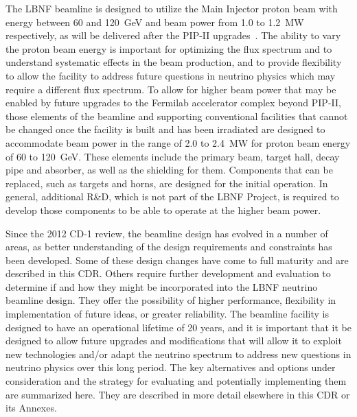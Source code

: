 The LBNF beamline is designed to utilize the Main Injector proton beam with energy between 60 and 120~GeV and beam power from 1.0 to 1.2~MW respectively, as will be delivered after the PIP-II upgrades~\cite{pip2-2013}.   %
The ability to vary the 
proton beam energy is important for optimizing the flux spectrum and to understand systematic effects in the beam production, and to provide flexibility to allow the facility to address future questions in neutrino physics which may require a 
different flux spectrum.  To allow for higher beam power that may be enabled by future upgrades to the Fermilab accelerator complex beyond PIP-II, those elements of the beamline and supporting conventional facilities that cannot be changed once 
the facility is built and has been irradiated are designed to accommodate beam power in the range of 2.0 to 2.4~MW for proton beam energy of 60 to 120~GeV.  These elements include the primary beam, target hall, decay pipe and absorber, as 
well as the shielding for them.  Components that can be replaced, such as targets and horns, are designed for the  initial operation.  In general, additional R\&D, which is not part of the LBNF Project, is required to develop those components to be able to operate at the higher beam power.
 
Since the 2012 CD-1 review, the beamline design has evolved in a number of areas, as better understanding of the design requirements and constraints has been developed.  Some of these design changes have come to full maturity and are 
described in this CDR.  Others require further development and evaluation to determine if and how they might be incorporated into the LBNF neutrino beamline design.  They offer the possibility of higher performance, flexibility in 
implementation of future ideas, or greater reliability. The beamline facility is designed to have an operational lifetime of 20 years, and it is important that it be designed to allow future upgrades and modifications that will allow it to 
exploit new 
technologies and/or adapt the neutrino spectrum to address new questions in neutrino physics over this long period. The key alternatives and options under consideration and the strategy for evaluating and potentially implementing them are summarized here.  They are described in more detail elsewhere in this CDR or its Annexes.  
               
